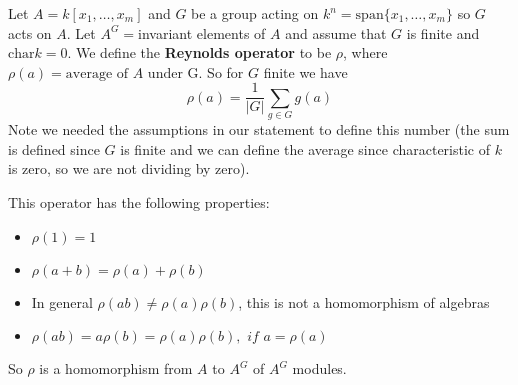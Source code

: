 \begin{definition}
    Let $A = k[x_1,\dots,x_m]$ and $G$ be a group acting on $k^n =\text{span}\{x_1,\dots,x_m\}$ so $G$ acts on $A$. Let $A^G = $invariant elements of $A$ and assume that $G$ is finite and $\text{char} k = 0$.
We define the \textbf{Reynolds operator} to be $\rho$, where $\rho(a) = \text{average of }A \text{ under G}$. So for $G$ finite we have\begin{equation}
    \rho(a) = \frac{1}{|G|}\sum_{g\in G}g(a)
\end{equation}
Note we needed the assumptions in our statement to define this number (the sum is defined since $G$ is finite and we can define the average since characteristic of $k$ is zero, so we are not dividing by zero).

This operator has the following properties:\begin{itemize}
\item $\rho(1) = 1$
\item $\rho(a+b) = \rho(a)+\rho(b)$
\item In general $\rho(ab)\neq \rho(a)\rho(b)$, this is not a homomorphism of algebras
\item $\rho(ab) = a\rho(b) = \rho(a)\rho(b), \textit{ if }a=\rho(a)$
\end{itemize}

So $\rho$ is a homomorphism from $A$ to $A^G$ of $A^G$ modules.
\end{definition}
